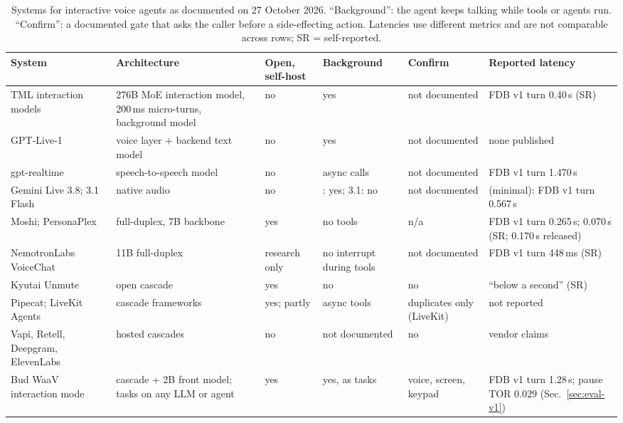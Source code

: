 \begin{table}[t]
\centering
\caption{Systems for interactive voice agents as documented on 27 October 2026. ``Background'': the agent keeps
talking while tools or agents run. ``Confirm'': a documented gate that asks the caller before a side-effecting
action. Latencies use different metrics and are not comparable across rows; SR = self-reported.}
\label{tab:related}
\footnotesize
\begin{tabularx}{\textwidth}{@{}>{\raggedright\arraybackslash}p{2.6cm}>{\raggedright\arraybackslash}X>{\raggedright\arraybackslash}p{1.15cm}>{\raggedright\arraybackslash}p{1.75cm}>{\raggedright\arraybackslash}p{1.55cm}>{\raggedright\arraybackslash}p{2.75cm}@{}}
\toprule
System & Architecture & Open, self-host & Background & Confirm & Reported latency \\
\midrule
TML interaction models~\citep{tml2026interaction} & 276B MoE interaction model, 200\,ms micro-turns, background model & no & yes & not documented & FDB v1 turn 0.40\,s (SR) \\
GPT-Live-1~\citep{openai2026gptliveapi} & voice layer + backend text model & no & yes & not documented & none published \\
gpt-realtime~\citep{openai2025gptrealtime} & speech-to-speech model & no & async calls & not documented & FDB v1 turn 1.470\,s~\citep{fdb_repo} \\
Gemini Live 3.8; 3.1 Flash~\citep{google2026g38,google_g31doc} & native audio & no & 3.8: yes; 3.1: no & not documented & 3.1 (minimal): FDB v1 turn 0.567\,s~\citep{fdb_repo} \\
Moshi; PersonaPlex~\citep{defossez2024moshi,roy2026personaplex} & full-duplex, 7B backbone & yes & no tools & n/a & FDB v1 turn 0.265\,s; 0.070\,s (SR; 0.170\,s released) \\
NemotronLabs VoiceChat~\citep{nvidia2026voicechat} & 11B full-duplex & research only & no interrupt during tools & not documented & FDB v1 turn 448\,ms (SR) \\
Kyutai Unmute~\citep{kyutai_unmute} & open cascade & yes & no & no & ``below a second'' (SR) \\
Pipecat; LiveKit Agents~\citep{pipecat_fc,livekit2026async} & cascade frameworks & yes; partly & async tools & duplicates only (LiveKit) & not reported \\
Vapi, Retell, Deepgram, ElevenLabs~\citep{vapi_tools,retell_interrupt,deepgram_fc,elevenlabs_toolint} & hosted cascades & no & not documented & no & vendor claims \\
\midrule
Bud WaaV interaction mode & cascade + 2B front model; tasks on any LLM or agent & yes & yes, as tasks & voice, screen, keypad & FDB v1 turn 1.28\,s; pause TOR 0.029 (Sec.~\ref{sec:eval-v1}) \\
\bottomrule
\end{tabularx}
\end{table}

